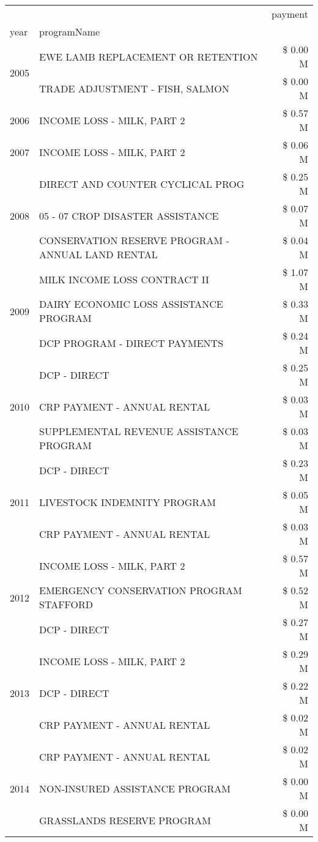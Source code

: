 \begin{tabular}{llr}
\toprule
 &  & payment \\
year & programName &  \\
\midrule
\multirow[t]{2}{*}{2005} & EWE LAMB REPLACEMENT OR RETENTION & \$ 0.00 M \\
 & TRADE ADJUSTMENT - FISH, SALMON & \$ 0.00 M \\
\cline{1-3}
2006 & INCOME LOSS - MILK, PART 2 & \$ 0.57 M \\
\cline{1-3}
2007 & INCOME LOSS - MILK, PART 2 & \$ 0.06 M \\
\cline{1-3}
\multirow[t]{3}{*}{2008} & DIRECT AND COUNTER CYCLICAL PROG & \$ 0.25 M \\
 & 05 - 07 CROP DISASTER ASSISTANCE & \$ 0.07 M \\
 & CONSERVATION RESERVE PROGRAM - ANNUAL LAND RENTAL & \$ 0.04 M \\
\cline{1-3}
\multirow[t]{3}{*}{2009} & MILK INCOME LOSS CONTRACT II & \$ 1.07 M \\
 & DAIRY ECONOMIC LOSS ASSISTANCE PROGRAM & \$ 0.33 M \\
 & DCP PROGRAM - DIRECT PAYMENTS & \$ 0.24 M \\
\cline{1-3}
\multirow[t]{3}{*}{2010} & DCP - DIRECT & \$ 0.25 M \\
 & CRP PAYMENT - ANNUAL RENTAL & \$ 0.03 M \\
 & SUPPLEMENTAL REVENUE ASSISTANCE PROGRAM & \$ 0.03 M \\
\cline{1-3}
\multirow[t]{3}{*}{2011} & DCP - DIRECT & \$ 0.23 M \\
 & LIVESTOCK INDEMNITY PROGRAM & \$ 0.05 M \\
 & CRP PAYMENT - ANNUAL RENTAL & \$ 0.03 M \\
\cline{1-3}
\multirow[t]{3}{*}{2012} & INCOME LOSS - MILK, PART 2 & \$ 0.57 M \\
 & EMERGENCY CONSERVATION PROGRAM STAFFORD & \$ 0.52 M \\
 & DCP - DIRECT & \$ 0.27 M \\
\cline{1-3}
\multirow[t]{3}{*}{2013} & INCOME LOSS - MILK, PART 2 & \$ 0.29 M \\
 & DCP - DIRECT & \$ 0.22 M \\
 & CRP PAYMENT - ANNUAL RENTAL & \$ 0.02 M \\
\cline{1-3}
\multirow[t]{3}{*}{2014} & CRP PAYMENT - ANNUAL RENTAL & \$ 0.02 M \\
 & NON-INSURED ASSISTANCE PROGRAM & \$ 0.00 M \\
 & GRASSLANDS RESERVE PROGRAM & \$ 0.00 M \\

\end{tabular}

